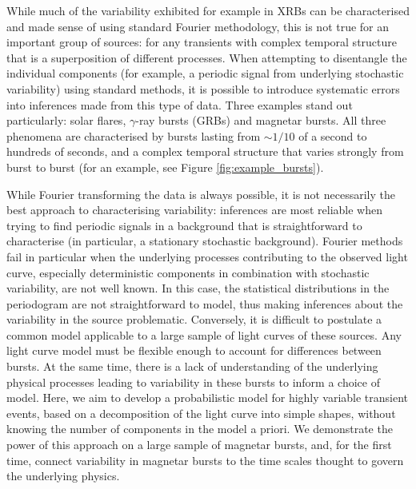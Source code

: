 \documentclass[12pt]{emulateapj}
\begin{document}
While much of the variability exhibited for example in XRBs can be characterised and made sense of using standard Fourier methodology, this is not true for an important group of sources: for any transients 
with complex temporal structure that is a superposition of different processes. When attempting to disentangle the individual components (for example, a periodic signal from underlying stochastic variability)
using standard methods, it is possible to introduce systematic errors into inferences made from this type of data. Three examples stand out particularly: solar flares, $\gamma$-ray bursts (GRBs) and magnetar bursts.  All three phenomena are characterised by bursts lasting from $\sim\!\! 1/10$ of a second to hundreds of seconds, and a 
complex temporal structure that varies strongly from burst to burst (for an example, see Figure \ref{fig:example_bursts}). 

While Fourier transforming the data is always possible, it is not necessarily the best approach to characterising variability: inferences are most reliable when trying to find
periodic signals in a background that is straightforward to characterise (in particular, a stationary stochastic background).
Fourier methods fail in particular when the underlying processes contributing to the observed light curve, especially deterministic 
components in combination with stochastic variability, are not well known. In this case,
the statistical distributions in the periodogram are not straightforward to model, thus making inferences about the variability in the source problematic. Conversely, 
it is difficult to postulate a common model applicable to a large sample of light curves of these sources. Any light curve model must be flexible enough to account for differences between bursts. 
At the same time, there is a lack of understanding of the underlying physical processes leading to variability in these bursts to inform a choice of model. Here, we aim to develop a probabilistic 
model for highly variable transient events, based on a decomposition of the light curve into simple shapes, without knowing the number of components in the model a priori. We demonstrate the 
power of this approach on a large sample of magnetar bursts, and, for the first time, connect variability in magnetar bursts to the time scales thought to govern the underlying physics.

\end{document}
